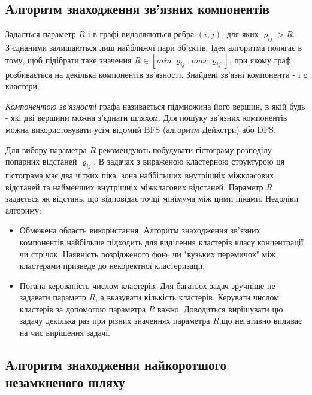 \documentclass[a4paper,14pt,russian]{extreport}
\begin{document}
		\subsection{Алгоритм знаходження зв'язних компонентів}
		Задається параметр $R$ і в графі видаляяються ребра $(i,j)$, для яких $\varrho_{ij} > R$. З'єднаними залишаються лиш найближчі пари об'єктів. Ідея алгоритма полягає в тому, щоб підібрати таке значення $R \in [min \ \varrho_{ij}, max \ \varrho_{ij}]$, при якому граф розбивається на декілька компонентів зв'язності. Знайдені зв'язні компоненти - і є кластери. \par 
		\textit{Компонентою зв'язності} графа називається підмножина його вершин, в якій будь - які дві вершини можна з'єднати шляхом. Для пошуку зв'язних компонентів можна використовувати усім відомий BFS (алгоритм Дейкстри) або DFS. \par
		Для вибору параметра $R$ рекомендують побудувати гістограму розподілу попарних відстаней $\varrho_{ij}$. В задачах з вираженою кластерною структурою ця гістограма має два чітких піка: зона найбільших внутрішніх міжкласових відстаней та найменших внутрішніх міжкласових відстаней. Параметр $R$ задається як відстань, що відповідає точці мінімума між цими піками.
		Недоліки алгориму:
		\begin{itemize}
			
			\item Обмежена область використання. Алгоритм знаходження зв'язних компонентів найбільше підходить для виділення кластерів класу концентрації чи стрічок. Наявність розрідженого фонe чи "вузьких перемичок" між кластерами призведе до некоректної кластеризації. 
			
			\item Погана керованість числом кластерів. Для багатьох задач зручніше не задавати параметр $R$, а вказувати кількість кластерів. Керувати числом кластерів за допомогою параметра $R$ важко. Доводиться вирішувати цю задачу декілька раз при різних значеннях параметра $R$,що негативно впливає на чис вирішення задачі.
		
		\end{itemize}
		
		\subsection{Алгоритм знаходження найкоротшого незамкненого шляху}
		
\end{document}
